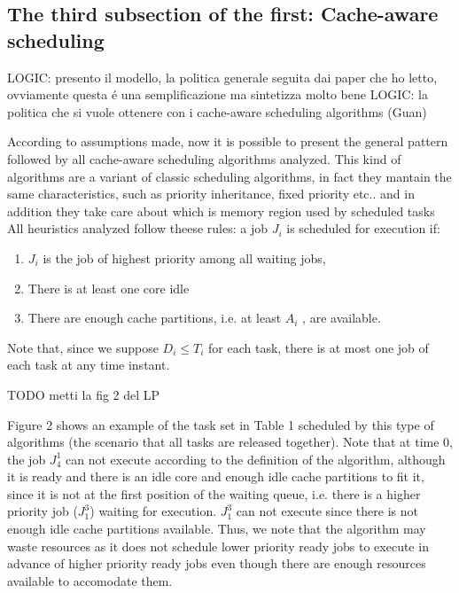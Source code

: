 \documentclass[a4paper,10pt]{article}
\begin{document}
\begin{multicols}{2}
\subsection{The third subsection of the first: Cache-aware scheduling}

LOGIC: presento il modello, la politica generale seguita dai paper che ho letto, ovviamente questa \'e una semplificazione ma sintetizza molto bene
LOGIC: la politica che si vuole ottenere con i cache-aware scheduling algorithms (Guan)

According to assumptions made, now it is possible to present the general pattern followed by all cache-aware scheduling algorithms analyzed.
This kind of algorithms are a variant of classic scheduling algorithms, in fact they mantain the same characteristics, such as priority inheritance,
fixed priority etc.. and in addition they take care about which is memory region used by scheduled tasks
All heuristics analyzed follow theese rules: a job $J_i$ is scheduled for execution if:

\begin{enumerate}
	\item $J_i$ is the job of highest priority among all waiting jobs,
	\item There is at least one core idle
	\item There are enough cache partitions, i.e. at least $A_i$ , are available.
\end{enumerate}

Note that, since we suppose $D_i \le T_i$ for each task, there is at most one job of each task at any time instant.

TODO metti la fig 2 del LP

Figure 2 shows an example of the task set in Table 1 scheduled by this type of algorithms (the scenario that all tasks are released
together). Note that at time 0, the job $J_{4}^1$ can not execute according to the definition of the algorithm, although it is ready and
there is an idle core and enough idle cache partitions to fit it, since it is not at the first position of the waiting queue,
i.e. there is a higher priority job ($J_{1}^3$) waiting for execution. $J_{1}^3$ can not execute since there is not enough idle cache
partitions available. Thus, we note that the algorithm may waste resources as it does not schedule lower priority ready jobs to execute in advance of 
higher priority ready jobs even though there are enough resources available to accomodate them.


\end{multicols}
\end{document}
